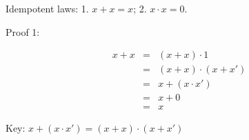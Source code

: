 \documentclass{article}
\begin{document}
Idempotent laws: 1. $x + x = x$; 2. $x \cdot x = 0$.

Proof 1:

\begin{eqnarray*}
x + x & = & (x + x)\cdot 1 \\
& = & (x + x)\cdot (x + x') \\
& = & x + (x \cdot x') \\
& = & x + 0 \\
& = & x
\end{eqnarray*}

Key: $x + (x \cdot x') = (x + x) \cdot (x + x')$
\end{document}

